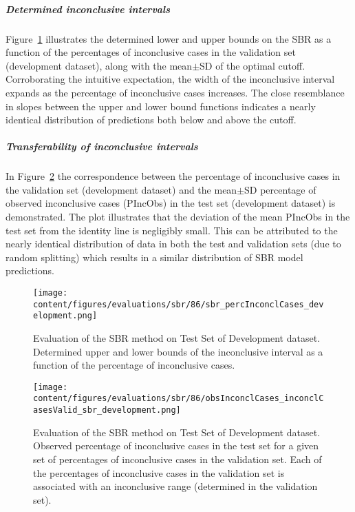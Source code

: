 \subparagraph{Determined inconclusive intervals}

Figure~\ref{fig:sbr_percInconclCases_development} illustrates the determined lower and upper bounds on the SBR 
as a function of the percentages of inconclusive cases in the validation set (development dataset), 
along with the mean$\pm$SD of the optimal cutoff.
Corroborating the intuitive expectation, the width of the inconclusive interval expands 
as the percentage of inconclusive cases increases.
The close resemblance in slopes between the upper and lower bound functions 
indicates a nearly identical distribution of predictions both below and above the cutoff.

\subparagraph{Transferability of inconclusive intervals}

In Figure~\ref{fig:obsInconclCases_inconclCasesValid_sbr_development} the correspondence between 
the percentage of inconclusive cases in the validation set (development dataset) and 
the mean$\pm$SD percentage of observed inconclusive cases (PIncObs) in the test set (development dataset) is demonstrated.
The plot illustrates that the deviation of the mean PIncObs in the test set from the 
identity line is negligibly small.
This can be attributed to the nearly identical distribution of data in both the test and validation sets 
(due to random splitting) which results in a similar distribution of SBR model predictions.


\begin{figure}[ht]
    \centering
    \texttt{[image: content/figures/evaluations/sbr/86/sbr\_percInconclCases\_development.png]}
    \caption{Evaluation of the SBR method on Test Set of Development dataset. 
    Determined upper and lower bounds of the inconclusive interval as a function of the percentage of inconclusive cases.} 
    \label{fig:sbr_percInconclCases_development}
\end{figure}


\begin{figure}[ht]
    \centering
    \texttt{[image: content/figures/evaluations/sbr/86/obsInconclCases\_inconclCasesValid\_sbr\_development.png]}
    \caption{Evaluation of the SBR method on Test Set of Development dataset.
    Observed percentage of inconclusive cases in the test set 
    for a given set of percentages of inconclusive cases in the validation set.
    Each of the percentages of inconclusive cases in the validation set is associated 
    with an inconclusive range (determined in the validation set).} 
    \label{fig:obsInconclCases_inconclCasesValid_sbr_development}
\end{figure} 

